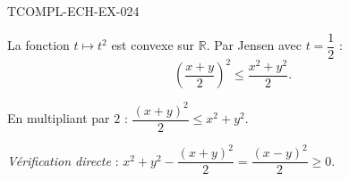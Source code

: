 \begin{corrige}{TCOMPL-ECH-EX-024}

La fonction $t \mapsto t^2$ est convexe sur $\mathbb{R}$. Par Jensen avec $t = \dfrac{1}{2}$ :
\[ \left(\frac{x+y}{2}\right)^2 \leq \frac{x^2 + y^2}{2}. \]


En multipliant par $2$ : $\dfrac{(x+y)^2}{2} \leq x^2 + y^2$.

\emph{Vérification directe} : $x^2 + y^2 - \dfrac{(x+y)^2}{2} = \dfrac{(x-y)^2}{2} \geq 0$.

\end{corrige}
